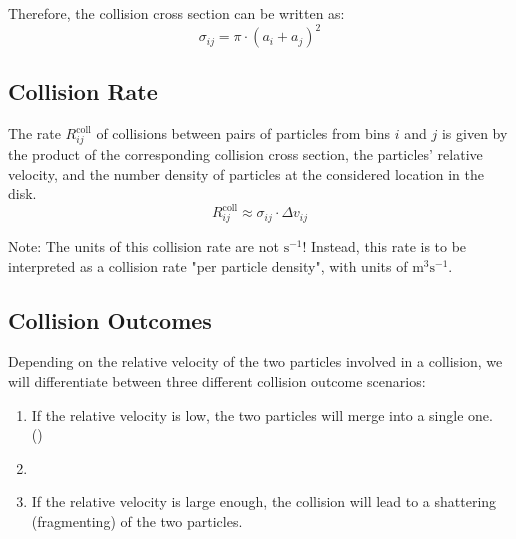         Therefore, the collision cross section can be written as:
        \begin{equation}
            \sigma_{ij} = \pi \cdot (a_i+a_j)^2
        \end{equation}

    \subsection{Collision Rate}

        The rate $R^\text{coll}_{ij}$ of collisions between pairs of particles from bins $i$ 
        and $j$ is given by the product of the corresponding collision cross section, the
        particles' relative velocity, and the number density of particles at the considered 
        location in the disk. 
        \begin{equation}                                            %
            R^\text{coll}_{ij}
                \approx \sigma_{ij} \cdot \Delta v_{ij}
        \end{equation}

        Note: The units of this collision rate are not $\text{s}^{-1}$! Instead, this rate is 
        to be interpreted as a collision rate "per particle density", with units of 
        $\text{m}^{3} \text{s}^{-1}$.

        

    \subsection{Collision Outcomes}

        Depending on the relative velocity of the two particles involved in a collision,
        we will differentiate between three different collision outcome scenarios:
        \begin{enumerate}
            \item If the relative velocity is low, the two particles will merge into a single one.
                \\ ()
            \item {}
            \item If the relative velocity is large enough, the collision will lead to a shattering 
                (fragmenting) of the two particles.
        \end{enumerate}

